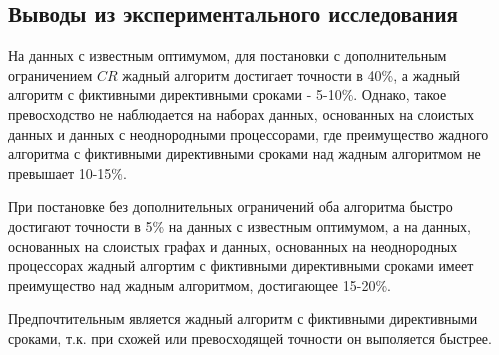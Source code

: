 \subsection{Выводы из экспериментального исследования}

На данных с известным оптимумом, для постановки с дополнительным ограничением $CR$ жадный алгоритм достигает точности в 40\%, а жадный алгоритм с фиктивными директивными сроками - 5-10\%. Однако, такое превосходство не наблюдается на наборах данных, основанных на слоистых данных и данных с неоднородными процессорами, где преимущество жадного алгоритма с фиктивными директивными сроками над жадным алгоритмом не превышает 10-15\%. 

При постановке без дополнительных ограничений оба алгоритма быстро достигают точности в 5\% на данных с известным оптимумом, а на данных, основанных на слоистых графах и данных, основанных на неоднородных процессорах жадный алгортим с фиктивными директивными сроками имеет преимущество над жадным алгоритмом, достигающее 15-20\%.

Предпочтительным является жадный алгоритм с фиктивными директивными сроками, т.к. при схожей или превосходящей точности он выполяется быстрее.